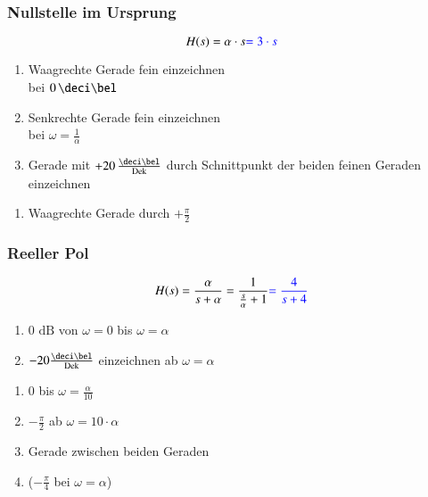 \subsubsection{Nullstelle im Ursprung}

\begin{minipage}[t]{0.48\columnwidth}
    $$ H(s) = \alpha \cdot s {\color{blue}= 3\cdot s} $$
    
\end{minipage}
\hfill
\begin{minipage}[t]{0.48\columnwidth}
        \begin{enumerate}
            \item Waagrechte Gerade fein einzeichnen\\bei $0 \, \deci \bel$
            \item Senkrechte Gerade fein einzeichnen\\bei $\omega = \frac{1}{\alpha}$
            \item Gerade mit $+20 \, \frac{\deci \bel}{\Dek}$ durch Schnittpunkt der beiden feinen Geraden einzeichnen\\
        \end{enumerate}
    
        \begin{enumerate}
            \item Waagrechte Gerade durch $+\frac{\pi}{2}$
        \end{enumerate}
\end{minipage}

\subsubsection{Reeller Pol}

\begin{minipage}[t]{0.48\columnwidth}
    $$ H(s) = \frac{\alpha}{s + \alpha} = \frac{1}{\frac{s}{\alpha} + 1} {\color{blue}= \frac{4}{s + 4}} $$
    
\end{minipage}
\hfill
\begin{minipage}[t]{0.48\columnwidth}
    \begin{enumerate}
        \item 0 $\text{dB}$ von $\omega=0$ bis $\omega=\alpha$
        \item $-20\frac{\deci \bel}{\Dek}$ einzeichnen ab $\omega = \alpha$\\
    \end{enumerate}

    \begin{enumerate}
        \item $0$ bis $\omega = \frac{\alpha}{10}$
        \item $-\frac{\pi}{2}$ ab $\omega = 10\cdot \alpha$
        \item Gerade zwischen beiden Geraden 
        \item ($-\frac{\pi}{4}$ bei $\omega=\alpha$)
    \end{enumerate}

\end{minipage}


